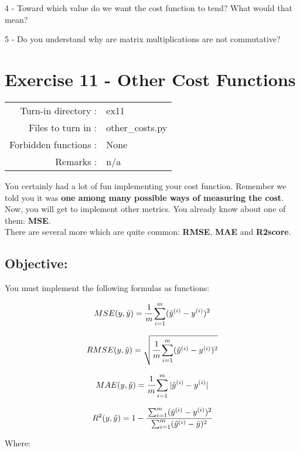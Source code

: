 \documentclass[]{article}
\begin{document}
4 - Toward which value do we want the cost function to tend? What would
that mean?

5 - Do you understand why are matrix multiplications are not
commutative?

\clearpage

\hypertarget{exercise-11---other-cost-functions}{%
\section{Exercise 11 - Other Cost
Functions}\label{exercise-11---other-cost-functions}}

\begin{longtable}[]{@{}rl@{}}
\toprule
\endhead
Turn-in directory : & ex11\tabularnewline
Files to turn in : & other\_costs.py\tabularnewline
Forbidden functions : & None\tabularnewline
Remarks : & n/a\tabularnewline
\bottomrule
\end{longtable}

You certainly had a lot of fun implementing your cost function. Remember
we told you it was \textbf{one among many possible ways of measuring the
cost}. Now, you will get to implement other metrics. You already know
about one of them: \textbf{MSE}.\\
There are several more which are quite common: \textbf{RMSE},
\textbf{MAE} and \textbf{R2score}.

\hypertarget{objective-7}{%
\subsection{Objective:}\label{objective-7}}

You must implement the following formulas as functions:

\large

\[
MSE(y, \hat{y}) = \cfrac{1}{m}\sum_{i=1}^{m}(\hat{y}^{(i)} - y^{(i)})^2
\] \normalsize

\large

\[
RMSE(y, \hat{y}) = \sqrt{\cfrac{1}{m}\sum_{i=1}^{m}(\hat{y}^{(i)} - y^{(i)})^2}
\] \normalsize

\large

\[
MAE(y, \hat{y}) = \cfrac{1}{m}\sum_{i=1}^{m}|{\hat{y}^{(i)} - y^{(i)}}|
\] \normalsize

\large

\[
R^2(y, \hat{y}) = 1 - \cfrac{\sum_{i=1}^{m}(\hat{y}^{(i)} - y^{(i)})^2}{\sum_{i=1}^{m}(\hat{y}^{(i)} - \bar{y})^2}
\] \normalsize

Where:
\end{document}
